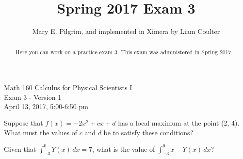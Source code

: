 \documentclass[handout]{ximera}
\author{Mary E. Pilgrim, and implemented in Ximera by Liam Coulter}
\title{Spring 2017 Exam 3}
\begin{document}
\begin{abstract}
  Here you can work on a practice exam 3. This exam was administered in Spring 2017.
\end{abstract}
\maketitle

\begin{center}
\Large{Math 160 Calculus for Physical Scientists I \\ Exam 3 - Version 1 \\ April 13, 2017, 5:00-6:50 pm}
\end{center}



\begin{problem}
Suppose that $f(x) = -2x^2+cx+d$ has a local maximum at the point (2, 4). What must the values of $c$ and $d$ be to satisfy these conditions?
\begin{multipleChoice}
\end{multipleChoice}
\end{problem}


\begin{problem}
Given that $\displaystyle\int_{-3}^0 Y(x) \,dx=7$, what is the value of $\displaystyle\int_{-3}^0 x-Y(x) \,dx$?
\begin{multipleChoice}
\end{multipleChoice}
\end{problem}
\end{document}
